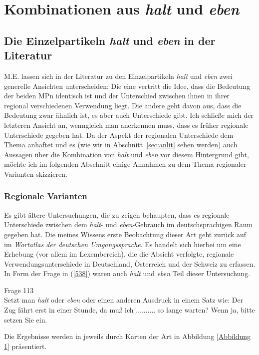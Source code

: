 \chapter{Kombinationen aus \textit{halt} und \textit{eben}}
\label{chapter:hue}
\section{Die Einzelpartikeln \textit{halt} und \textit{eben} in der Literatur}
\label{sec:hueinliteratur}
M.E. lassen sich in der Literatur zu den Einzelpartikeln \textit{halt} und \textit{eben} zwei generel\-le Ansichten unterscheiden: Die eine vertritt die Idee, dass die Bedeutung der beiden MPn identisch ist und der Unterschied zwischen ihnen in ihrer regional verschiedenen Verwendung liegt. Die andere geht davon aus, dass die Bedeutung zwar ähnlich ist, es aber auch Unterschiede gibt. Ich schließe mich der letzteren Ansicht an, wenngleich man anerkennen muss, dass es früher regionale Unterschiede gegeben hat. Da der Aspekt der regionalen Unterschiede dem Thema anhaftet und es (wie wir in Abschnitt~\ref{sec:anlit} sehen werden) auch Aussagen über die Kombination von \textit{halt} und \textit{eben} vor diesem Hintergrund gibt, möchte ich im folgenden Abschnitt einige Annahmen zu dem Thema regionaler Varianten skizzieren.

\subsection{Regionale Varianten}
\label{sec:regio}
Es gibt ältere Untersuchungen, die zu zeigen behaupten, dass es regionale Unterschiede zwischen dem \textit{halt}- und \textit{eben}-Gebrauch im deutschsprachigen Raum gegeben hat. Die meines Wissens erste Beobachtung dieser Art geht zurück auf \citet{Eichhoff1978} im \textit{Wortatlas der deutschen Umgangssprache}. Es handelt sich hierbei um eine Erhebung (vor allem im Lexembereich), die die Absicht verfolgte, regionale Verwendungsunterschiede in Deutschland, Österreich und der Schweiz zu erfassen. In Form der Frage in (\ref{538}) waren auch \textit{halt} und \textit{eben} Teil dieser Untersuchung.

\begin{exe}
	\ex\label{538} Frage 113\\
    Setzt man \textit{halt} oder \textit{eben} oder einen anderen Ausdruck in einem Satz wie: \glqq Der Zug fährt erst in einer Stunde, da muß ich .......... so lange warten?\grqq{} Wenn ja, bitte setzen Sie ein.
\hfill\hbox{\citet[31]{Eichhoff1978}}    
\end{exe}
Die Ergebnisse werden in \citet{Eichhoff1978} jeweils durch Karten der Art in Abbildung \ref{Abbildung 1} präsentiert.

